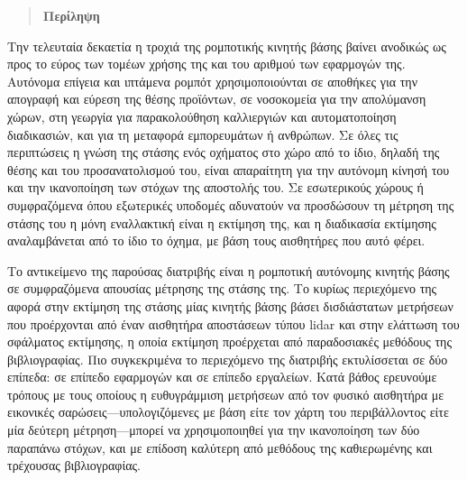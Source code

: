 \singlespace

\vfill
\begin{quotation}
\begin{center}
\textbf{Περίληψη}
\end{center}
\noindent
\end{quotation}

Την τελευταία δεκαετία η τροχιά της ρομποτικής κινητής βάσης βαίνει ανοδικώς ως
προς το εύρος των τομέων χρήσης της και του αριθμού των εφαρμογών της. Αυτόνομα
επίγεια και ιπτάμενα ρομπότ χρησιμοποιούνται σε αποθήκες για την απογραφή και
εύρεση της θέσης προϊόντων, σε νοσοκομεία για την απολύμανση χώρων, στη γεωργία
για παρακολούθηση καλλιεργιών και αυτοματοποίηση διαδικασιών, και για τη
μεταφορά εμπορευμάτων ή ανθρώπων. Σε όλες τις περιπτώσεις η γνώση της στάσης
ενός οχήματος στο χώρο από το ίδιο, δηλαδή της θέσης και του προσανατολισμού
του, είναι απαραίτητη για την αυτόνομη κίνησή του και την ικανοποίηση των
στόχων της αποστολής του. Σε εσωτερικούς χώρους ή συμφραζόμενα όπου εξωτερικές
υποδομές αδυνατούν να προσδώσουν τη μέτρηση της στάσης του η μόνη εναλλακτική
είναι η εκτίμηση της, και η διαδικασία εκτίμησης αναλαμβάνεται από το ίδιο το
όχημα, με βάση τους αισθητήρες που αυτό φέρει.

Το αντικείμενο της παρούσας διατριβής είναι η ρομποτική αυτόνομης κινητής βάσης
σε συμφραζόμενα απουσίας μέτρησης της στάσης της. Το κυρίως περιεχόμενο της
αφορά στην εκτίμηση της στάσης μίας κινητής βάσης βάσει δισδιάστατων μετρήσεων
που προέρχονται από έναν αισθητήρα αποστάσεων τύπου lidar και στην ελάττωση του
σφάλματος εκτίμησης, η οποία εκτίμηση προέρχεται από παραδοσιακές μεθόδους της
βιβλιογραφίας. Πιο συγκεκριμένα το περιεχόμενο της διατριβής εκτυλίσσεται σε
δύο επίπεδα: σε επίπεδο εφαρμογών και σε επίπεδο εργαλείων.  Κατά βάθος
ερευνούμε τρόπους με τους οποίους η ευθυγράμμιση μετρήσεων από τον φυσικό
αισθητήρα με εικονικές σαρώσεις---υπολογιζόμενες με βάση είτε τον χάρτη του
περιβάλλοντος είτε μία δεύτερη μέτρηση---μπορεί να χρησιμοποιηθεί για την
ικανοποίηση των δύο παραπάνω στόχων, και με επίδοση καλύτερη από μεθόδους της
καθιερωμένης και τρέχουσας βιβλιογραφίας.

